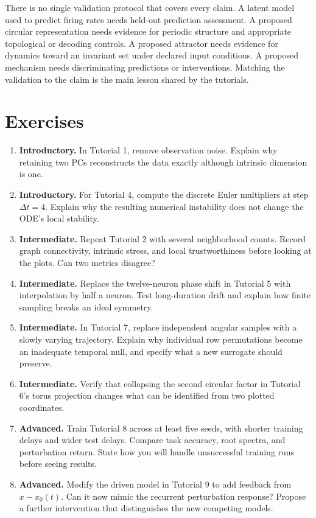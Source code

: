 There is no single validation protocol that covers every claim. A latent model used to predict firing rates needs held-out prediction assessment. A proposed circular representation needs evidence for periodic structure and appropriate topological or decoding controls. A proposed attractor needs evidence for dynamics toward an invariant set under declared input conditions. A proposed mechanism needs discriminating predictions or interventions. Matching the validation to the claim is the main lesson shared by the tutorials.

\section{Exercises}
\begin{enumerate}
\item \textbf{Introductory.} In Tutorial 1, remove observation noise. Explain why retaining two PCs reconstructs the data exactly although intrinsic dimension is one.
\item \textbf{Introductory.} For Tutorial 4, compute the discrete Euler multipliers at step $\Delta t=4$. Explain why the resulting numerical instability does not change the ODE's local stability.
\item \textbf{Intermediate.} Repeat Tutorial 2 with several neighborhood counts. Record graph connectivity, intrinsic stress, and local trustworthiness before looking at the plots. Can two metrics disagree?
\item \textbf{Intermediate.} Replace the twelve-neuron phase shift in Tutorial 5 with interpolation by half a neuron. Test long-duration drift and explain how finite sampling breaks an ideal symmetry.
\item \textbf{Intermediate.} In Tutorial 7, replace independent angular samples with a slowly varying trajectory. Explain why individual row permutations become an inadequate temporal null, and specify what a new surrogate should preserve.
\item \textbf{Intermediate.} Verify that collapsing the second circular factor in Tutorial 6's torus projection changes what can be identified from two plotted coordinates.
\item \textbf{Advanced.} Train Tutorial 8 across at least five seeds, with shorter training delays and wider test delays. Compare task accuracy, root spectra, and perturbation return. State how you will handle unsuccessful training runs before seeing results.
\item \textbf{Advanced.} Modify the driven model in Tutorial 9 to add feedback from $x-x_0(t)$. Can it now mimic the recurrent perturbation response? Propose a further intervention that distinguishes the new competing models.
\end{enumerate}

